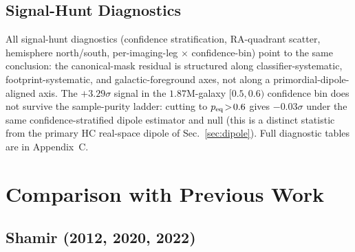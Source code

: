 \documentclass[aps,prd,twocolumn,superscriptaddress,preprintnumbers,nofootinbib,longbibliography,floatfix]{revtex4-2}
\newcommand{\sigmaunit}{\sigma}
\begin{document}
\subsection{Signal-Hunt Diagnostics}
\label{sec:signal_hunt}

All signal-hunt diagnostics (confidence stratification, RA-quadrant scatter, hemisphere north/south, per-imaging-leg $\times$ confidence-bin) point to the same conclusion: the canonical-mask residual is structured along classifier-systematic, footprint-systematic, and galactic-foreground axes, not along a primordial-dipole-aligned axis. The $+3.29\sigmaunit$ signal in the $1.87$M-galaxy $[0.5,0.6)$ confidence bin does not survive the sample-purity ladder: cutting to $p_{\rm eq}\!>\!0.6$ gives $-0.03\sigmaunit$ under the same confidence-stratified dipole estimator and null (this is a distinct statistic from the primary HC real-space dipole of Sec.~\ref{sec:dipole}). Full diagnostic tables are in Appendix~C.

\section{Comparison with Previous Work}
\label{sec:comparison}

\subsection{Shamir (2012, 2020, 2022)}
\end{document}
